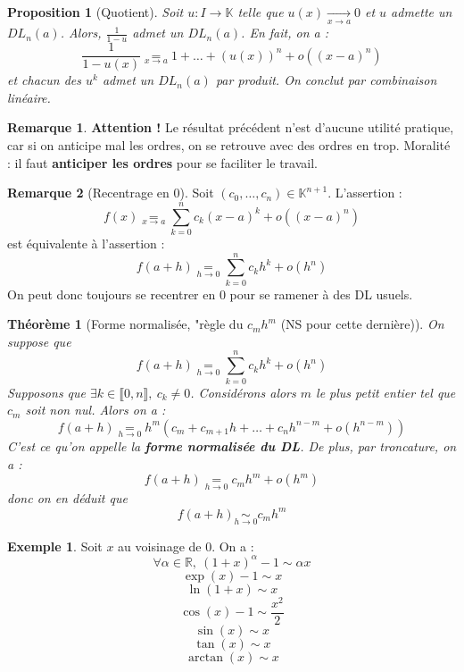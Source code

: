 \documentclass[french]{book}
\newcommand{\R}{\mathbb{R}}
\newcommand{\K}{\mathbb{K}}
\theoremstyle{plain}
\newtheorem{thm}{Théorème}[chapter]
\newtheorem{prop}{Proposition}[chapter]
\theoremstyle{definition}
\newtheorem{exa}{Exemple}[chapter]
\newtheorem{rmq}{Remarque}[chapter]
\theoremstyle{remark}
\begin{document}
\begin{prop}[Quotient]
	Soit $u:I\rightarrow\K$ telle que $u(x)\xrightarrow[x\to a]{}0$ et $u$ admette un $DL_n(a)$. Alors, $\displaystyle \frac{1}{1-u}$ admet un $DL_n(a)$. En fait, on a : $$\frac{1}{1-u(x)}\underset{x\to a}{=}1+\ldots+(u(x))^n+o\left((x-a)^n\right)$$ et chacun des $u^k$ admet un $DL_n(a)$ par produit. On conclut par combinaison linéaire.
\end{prop}
\begin{rmq}
	\textbf{Attention !} Le résultat précédent n'est d'aucune utilité pratique, car si on anticipe mal les ordres, on se retrouve avec des ordres en trop. Moralité : il faut \textbf{anticiper les ordres} pour se faciliter le travail.
\end{rmq}
\begin{rmq}[Recentrage en $0$]
	Soit $(c_0,\ldots,c_n)\in\K^{n+1}$. L'assertion : $$f(x)\underset{x\to a}{=}\sum_{k=0}^{n}c_k(x-a)^k+o\left((x-a)^n\right)$$ est équivalente à l'assertion : $$f(a+h)\underset{h\to 0}{=}\sum_{k=0}^{n}c_kh^k+o\left(h^n\right)$$ On peut donc toujours se recentrer en $0$ pour se ramener à des DL usuels.
\end{rmq}
\begin{thm}[Forme normalisée, "règle du $c_mh^m$ (NS pour cette dernière)]
	On suppose que $$f(a+h)\underset{h\to 0}{=}\sum_{k=0}^{n}c_kh^k+o\left(h^n\right)$$ Supposons que $\exists k\in\llbracket0,n\rrbracket,\ c_k\ne0$. Considérons alors $m$ le plus petit entier tel que $c_m$ soit non nul. Alors on a : $$f(a+h)\underset{h\to 0}{=}h^m\left(c_m+c_{m+1}h+\ldots+c_nh^{n-m}+o\left(h^{n-m}\right)\right)$$ C'est ce qu'on appelle la \textbf{forme normalisée du DL}. De plus, par troncature, on a : $$f(a+h)\underset{h\to 0}{=}c_mh^m+o(h^m)$$ donc on en déduit que $$f(a+h)\underset{h\to 0}{\sim}c_mh^m$$
\end{thm}
\begin{exa}
	Soit $x$ au voisinage de $0$. On a : $$\forall \alpha\in\R,\ (1+x)^\alpha-1\sim\alpha x$$ $$\exp(x)-1\sim x$$ $$\ln(1+x)\sim x$$ $$\cos(x)-1\sim\frac{x^2}{2}$$ $$\sin(x)\sim x$$ $$\tan(x)\sim x$$ $$\arctan(x)\sim x$$
\end{exa}
\end{document}
